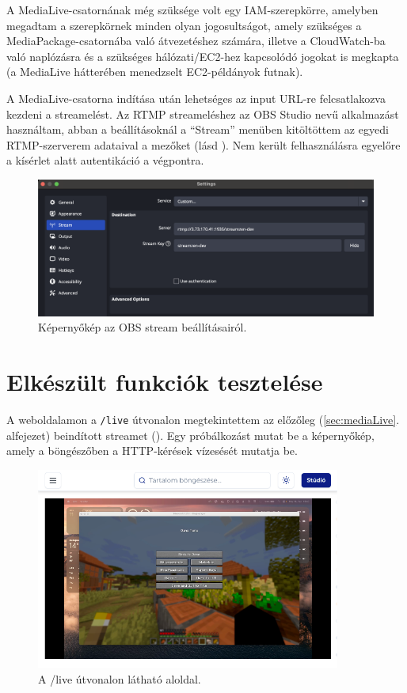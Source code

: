 A MediaLive-csatornának még szüksége volt egy IAM-szerepkörre, amelyben megadtam a szerepkörnek minden olyan jogosultságot, amely szükséges a MediaPackage-csatornába való átvezetéshez számára, illetve a CloudWatch-ba való naplózásra és a szükséges hálózati/EC2-hez kapcsolódó jogokat is megkapta (a MediaLive hátterében menedzselt EC2-példányok futnak).

A MediaLive-csatorna indítása után lehetséges az input URL-re felcsatlakozva kezdeni a streamelést. Az RTMP streameléshez az OBS Studio nevű alkalmazást használtam\cite{obsMediaLive}, abban a beállításoknál a ``Stream'' menüben kitöltöttem az egyedi RTMP-szerverem adataival a mezőket (lásd ). Nem került felhasználásra egyelőre a kísérlet alatt autentikáció a végpontra.

\begin{figure}[ht]
  \centering
  \includegraphics[width=150mm, keepaspectratio]{figures/obs.png}
  \caption{Képernyőkép az OBS stream beállításairól.}
  \label{fig:obs}
\end{figure}

\chapter{Elkészült funkciók tesztelése}

A weboldalamon a \verb|/live| útvonalon megtekintettem az előzőleg (\ref{sec:mediaLive}. alfejezet) beindított streamet (). Egy próbálkozást mutat be a  képernyőkép, amely a böngészőben a HTTP-kérések vízesését\cite{waterfall} mutatja be.

\begin{figure}[h]
  \centering
  \includegraphics[width=100mm, keepaspectratio]{figures/waterfall1.png}
  \caption{A /live útvonalon látható aloldal.}
  \label{fig:waterfall1}
\end{figure}


